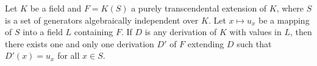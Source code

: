 Let $K$ be a field and $F = K(S)$ a purely transcendental extension of $K$, where $S$ is a set of generators algebraically independent over $K$. Let $x \mapsto u_x$ be a mapping of $S$ into a field $L$ containing $F$. If $D$ is any derivation of $K$ with values in $L$, then there exists one and only one derivation $D'$ of $F$ extending $D$ such that $D'(x) = u_x$ for all $x \in S$.
